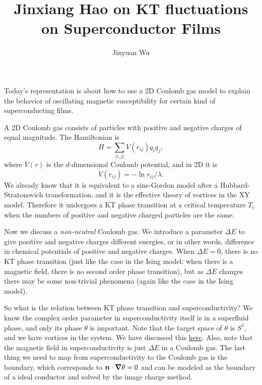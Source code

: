 \documentclass[hyperref, a4paper]{article}
\title{Jinxiang Hao on KT fluctuations on Superconductor Films}
\author{Jinyuan Wu}
\newcommand*{\pair}[1]{\langle #1 \rangle}
\begin{document}
\maketitle

Today's representation is about how to use a 2D Coulomb gas model to explain the behavior of oscillating magnetic 
susceptibility for certain kind of superconducting films.

A 2D Coulomb gas consists of particles with positive and negative charges of equal magnitude. 
The Hamiltonian is 
\begin{equation}
    H = \sum_{\pair{i, j}} V(r_{ij}) q_i q_j,
\end{equation}
where $V(r)$ is the $d$-dimensional Coulomb potential, and in 2D it is  
\begin{equation}
    V(r_{ij}) = - \ln r_{ij} / \lambda.
\end{equation}
We already know that it is equivalent to a sine-Gordon model after a Hubbard-Stratonovich transformation, and 
it is the effective theory of vortices in the XY model. Therefore it undergoes a KT phase transition at 
a critical temperature $T_\text{c}$ when the numbers of positive and negative charged particles are the same. 

Now we discuss a \emph{non-neutral} Coulomb gas. We introduce a parameter $\Delta E$ to give positive and 
negative charges different energies, or in other words, difference in chemical potentials of positive and 
negative charges. When $\Delta E = 0$, there is no KT phase transition (just like the case in the Ising model:
when there is a magnetic field, there is no second order phase transition), but as $\Delta E$ changes 
there may be some non-trivial phenomena (again like the case in the Ising model).

So what is the relation between KT phase transition and superconductivity? We know the complex order parameter 
in superconductivity itself is in a superfluid phase, and only its phase $\theta$ is important. Note that the 
target space of $\theta$ is $S^{1}$, and we have vortices in the system. We have discussed this
\href{../quantum-fluid/wen-boson.pdf}{here}. Also, note that the magnetic field in superconductivity is just 
$\Delta E$ in a Coulomb gas. The last thing we need to map from superconductivity to the Coulomb gas is the 
boundary, which corresponds to $\vb*{n} \cdot \grad \theta = 0$ and can be modeled as the boundary of a 
ideal conductor and solved by the image charge method.
\end{document}
